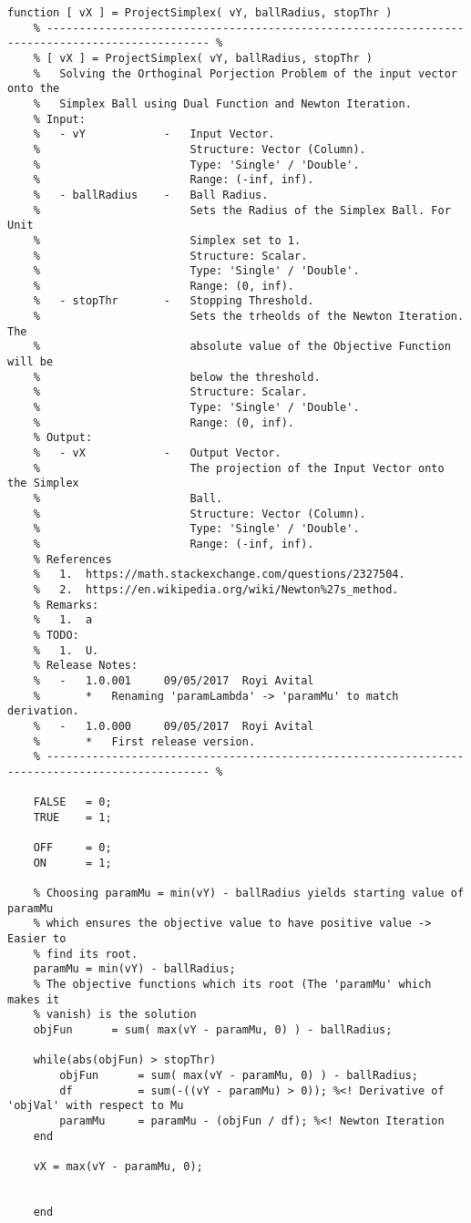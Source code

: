 \documentclass[]{article}
\begin{document}
	\begin{lstlisting}[caption={MATLAB Code - Simplex Projection}, label={lst:codeSimplexProjection}]
	function [ vX ] = ProjectSimplex( vY, ballRadius, stopThr )
	% ----------------------------------------------------------------------------------------------- %
	% [ vX ] = ProjectSimplex( vY, ballRadius, stopThr )
	%   Solving the Orthoginal Porjection Problem of the input vector onto the
	%   Simplex Ball using Dual Function and Newton Iteration.
	% Input:
	%   - vY            -   Input Vector.
	%                       Structure: Vector (Column).
	%                       Type: 'Single' / 'Double'.
	%                       Range: (-inf, inf).
	%   - ballRadius    -   Ball Radius.
	%                       Sets the Radius of the Simplex Ball. For Unit
	%                       Simplex set to 1.
	%                       Structure: Scalar.
	%                       Type: 'Single' / 'Double'.
	%                       Range: (0, inf).
	%   - stopThr       -   Stopping Threshold.
	%                       Sets the trheolds of the Newton Iteration. The
	%                       absolute value of the Objective Function will be
	%                       below the threshold.
	%                       Structure: Scalar.
	%                       Type: 'Single' / 'Double'.
	%                       Range: (0, inf).
	% Output:
	%   - vX            -   Output Vector.
	%                       The projection of the Input Vector onto the Simplex
	%                       Ball.
	%                       Structure: Vector (Column).
	%                       Type: 'Single' / 'Double'.
	%                       Range: (-inf, inf).
	% References
	%   1.  https://math.stackexchange.com/questions/2327504.
	%   2.  https://en.wikipedia.org/wiki/Newton%27s_method.
	% Remarks:
	%   1.  a
	% TODO:
	%   1.  U.
	% Release Notes:
	%   -   1.0.001     09/05/2017  Royi Avital
	%       *   Renaming 'paramLambda' -> 'paramMu' to match derivation.
	%   -   1.0.000     09/05/2017  Royi Avital
	%       *   First release version.
	% ----------------------------------------------------------------------------------------------- %
	
	FALSE   = 0;
	TRUE    = 1;
	
	OFF     = 0;
	ON      = 1;
	
	% Choosing paramMu = min(vY) - ballRadius yields starting value of paramMu
	% which ensures the objective value to have positive value -> Easier to
	% find its root.
	paramMu = min(vY) - ballRadius;
	% The objective functions which its root (The 'paramMu' which makes it
	% vanish) is the solution
	objFun      = sum( max(vY - paramMu, 0) ) - ballRadius;
	
	while(abs(objFun) > stopThr)
	    objFun      = sum( max(vY - paramMu, 0) ) - ballRadius;
	    df          = sum(-((vY - paramMu) > 0)); %<! Derivative of 'objVal' with respect to Mu
	    paramMu     = paramMu - (objFun / df); %<! Newton Iteration
	end
	
	vX = max(vY - paramMu, 0);
	
	
	end
	
	\end{lstlisting}
	
	
\end{document}
